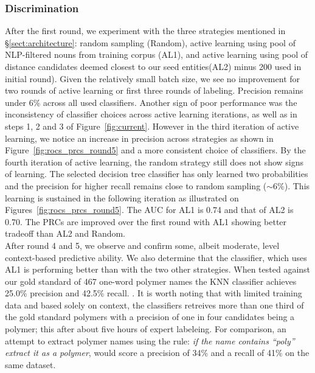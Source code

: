 \subsubsection{Discrimination}
After the first round, we experiment with the three strategies mentioned in \S\ref{sect:architecture}: random sampling (Random), active learning using pool of NLP-filtered nouns from training corpus (AL1), and active learning using pool of  distance candidates deemed closest to our seed entities(AL2) \textemdash minus 200 used in initial round).
Given the relatively small batch size, we see no improvement for two rounds of active learning or first three rounds of labeling. 
Precision remains under 6\% across all used classifiers. 
Another sign of poor performance was the inconsistency of classifier choices across active learning iterations, 
as well as in steps 1, 2 and 3 of Figure~\ref{fig:current}.
However in the third iteration of active learning, we notice an increase in precision across strategies as shown in Figure~\ref{fig:rocs_prcs_round5} and a more consistent choice of classifiers.
By the fourth iteration of active learning, the random strategy still does not show signs of learning. 
The selected decision tree classifier has only learned two probabilities and the precision for higher recall remains close to random sampling ($\sim 6\%$).
This learning is sustained in the following iteration as illustrated on Figures~\ref{fig:rocs_prcs_round5}. 
The AUC for AL1 is 0.74 and that of AL2 is 0.70. The PRCs are improved over the first round with AL1 showing better tradeoff than AL2 and Random.\\


After round 4 and 5,  we observe and confirm some, albeit moderate, level context-based predictive ability.
We also determine that the classifier, which uses AL1 is performing better than with the two other strategies.
When tested against our gold standard of 467 one-word polymer names the KNN classifier achieves 25.0\% precision and  42.5\% recall. .
It is worth noting that with limited training data and based solely on context, the classifiers retreives more than one third of the gold standard polymers with a precision of one in four candidates being a polymer; this after about five hours of expert labeleing. 
For comparison, an attempt to extract polymer names using the rule: \textit{if the name contains ``poly'' extract it as a polymer}, would score a precision of 34\% and a recall of 41\% on the same dataset.


